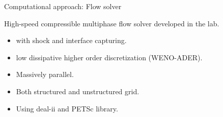 \documentclass[10pt, aspectratio=169]{beamer}
\begin{document}
\begin{frame}{Computational approach: Flow solver}
	
	High-speed compressible multiphase flow solver developed in the lab.
	\begin{itemize}
		\item with shock and interface capturing\cite{interface}.
		\item low dissipative higher order discretization (WENO-ADER\cite{ADER}).
		\item Massively parallel.
		\item Both structured and unstructured grid.
		\item Using deal-ii\cite{dealii} and PETSc library.
	\end{itemize}
\end{frame}
\end{document}
